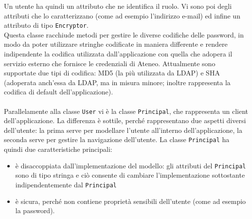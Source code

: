 Un utente ha quindi un attributo che ne identifica il ruolo. Vi sono poi degli attributi che lo caratterizzano (come ad esempio l'indirizzo e-mail) ed infine un attributo di tipo \texttt{Encryptor}. \\
Questa classe racchiude metodi per gestire le diverse codifiche delle password, in modo da poter utilizzare stringhe codificate in maniera differente e rendere indipendente la codifica utilizzata dall'applicazione con quella che adopera il servizio esterno che fornisce le credenziali di Ateneo. Attualmente sono supportate due tipi di codifica: MD5 (la più utilizzata da LDAP) e SHA (adoperata anch'essa da LDAP, ma in misura minore; inoltre rappresenta la codifica di default dell'applicazione).\\
\\

Parallelamente alla classe \texttt{User} vi è la classe \texttt{Principal}, che rappresenta un client dell'applicazione. La differenza è sottile, perché rappresentano due aspetti diversi dell'utente: la prima serve per modellare l'utente all'interno dell'applicazione, la seconda serve per gestire la navigazione dell'utente. La classe \texttt{Principal} ha quindi due caratteristiche principali:
\begin{itemize}
\item è disaccoppiata dall'implementazione del modello: gli attributi del \texttt{Principal} sono di tipo stringa e ciò consente di cambiare l'implementazione sottostante indipendentemente dal \texttt{Principal}
\item è sicura, perché non contiene proprietà sensibili dell'utente (come ad esempio la password).
\end{itemize}




